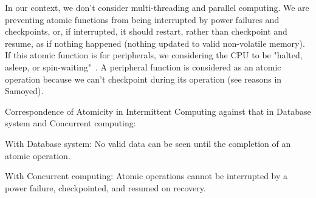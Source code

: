 In our context, we don't consider multi-threading and parallel computing. We are preventing atomic functions from being interrupted by power failures and checkpoints, or, if interrupted, it should restart, rather than checkpoint and resume, as if nothing happened (nothing updated to valid non-volatile memory). If this atomic function is for peripherals, we considering the CPU to be "halted, asleep, or spin-waiting"~\cite{maeng2019supporting}. A peripheral function is considered as an atomic operation because we can't checkpoint during its operation (see reasons in Samoyed).

Correspondence of Atomicity in Intermittent Computing against that in Database system and Concurrent computing:

With Database system: No valid data can be seen until the completion of an atomic operation.

With Concurrent computing: Atomic operations cannot be interrupted by a power failure, checkpointed, and resumed on recovery.
